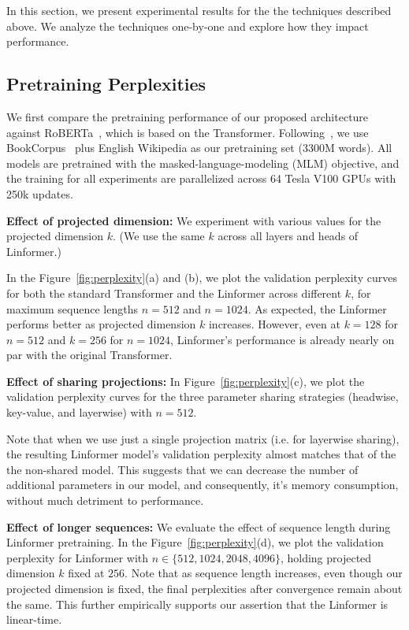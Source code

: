 In this section, we present experimental results for the the techniques described above. We analyze the techniques one-by-one and explore how they impact performance. 

\subsection{Pretraining Perplexities}

We first compare the pretraining performance of our proposed architecture against RoBERTa~\citep{liu2019roberta}, which is based on the Transformer. Following~\cite{devlin2019bert}, we use BookCorpus~\citep{zhu2015aligning} plus English Wikipedia as our pretraining set (3300M words). All models are pretrained with the masked-language-modeling (MLM) objective, and the training for all experiments are parallelized across 64 Tesla V100 GPUs with 250k updates.

\textbf{Effect of projected dimension:} We experiment with various values for the projected dimension $k$. (We use the same $k$ across all layers and heads of Linformer.)

In the Figure~\ref{fig:perplexity}(a) and (b), we plot the validation perplexity curves for both the standard Transformer and the Linformer across different $k$, for maximum sequence lengths $n=512$ and $n=1024$. As expected, the Linformer performs better as projected dimension $k$ increases. However, even at $k=128$ for $n=512$ and $k=256$ for $n=1024$, Linformer's performance is already nearly on par with the original Transformer.

\textbf{Effect of sharing projections:} In 
Figure~\ref{fig:perplexity}(c), we plot the validation perplexity curves for the three parameter sharing strategies (headwise, key-value, and layerwise) with $n=512$. 

Note that when we use just a single projection matrix (i.e. for layerwise sharing), the resulting Linformer model's validation perplexity almost matches that of the the non-shared model. This suggests that we can decrease the number of additional parameters in our model, and consequently, it's memory consumption, without much detriment to performance.

\textbf{Effect of longer sequences:} We evaluate the effect of sequence length during Linformer pretraining. In the Figure~\ref{fig:perplexity}(d), we plot the validation perplexity for Linformer with $n\in\{512, 1024, 2048, 4096\}$, holding projected dimension $k$ fixed at $256$. Note that as sequence length increases, even though our projected dimension is fixed, the final perplexities after convergence remain about the same. This further empirically supports our assertion that the Linformer is linear-time. 

